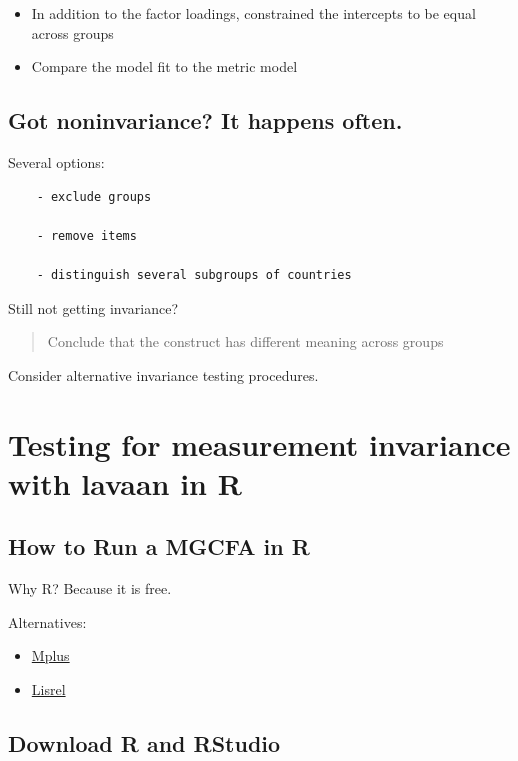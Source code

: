 \documentclass[
]{book}
\begin{document}
\begin{itemize}
\item
  In addition to the factor loadings, constrained the intercepts to be equal across groups
\item
  Compare the model fit to the metric model
\end{itemize}

\hypertarget{got-noninvariance-it-happens-often.}{%
\section{Got noninvariance? It happens often.}\label{got-noninvariance-it-happens-often.}}

Several options:

\begin{verbatim}
	- exclude groups
	
	- remove items

	- distinguish several subgroups of countries
\end{verbatim}

Still not getting invariance?

\begin{quote}
Conclude that the construct has different meaning across groups
\end{quote}

Consider alternative invariance testing procedures.

\hypertarget{lavaan}{%
\chapter{Testing for measurement invariance with lavaan in R}\label{lavaan}}

\hypertarget{how-to-run-a-mgcfa-in-r}{%
\section{How to Run a MGCFA in R}\label{how-to-run-a-mgcfa-in-r}}

Why R? Because it is free.

Alternatives:

\begin{itemize}
\item
  \href{https://www.statmodel.com/}{Mplus}
\item
  \href{https://ssicentral.com/index.php/products/lisrel/}{Lisrel}
\end{itemize}

\hypertarget{download-r-and-rstudio}{%
\section{Download R and RStudio}\label{download-r-and-rstudio}}
\end{document}
